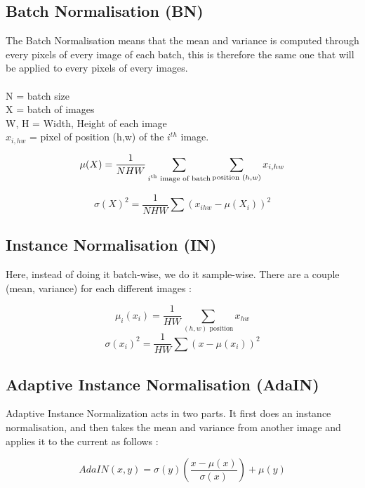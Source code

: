 \documentclass[a4paper]{article}
\begin{document}
\subsection{Batch Normalisation (BN)}
The Batch Normalisation means that the mean and variance is computed through every pixels of every image of each batch, this is therefore the same one that will be applied to every pixels of every images.
\\\\N = batch size
\\X = batch of images
\\W, H = Width, Height of each image
\\ $x_{i,hw}$ = pixel of position (h,w) of the $i^{th}$ image.

\begin{equation}
    \mu(X) = \frac{1}{NHW}\sum_{i\text{\textsuperscript{th} image of batch}}\sum_{\text{position }(h, w)} x_{i, hw}
\end{equation}

\begin{equation}
    \sigma(X)^2 = \frac{1}{NHW}\sum (x_{ihw} - \mu(X_i))^2 
\end{equation}

\subsection{Instance Normalisation (IN)}

Here, instead of doing it batch-wise, we do it sample-wise. There are a couple (mean, variance) for each different images : 

\begin{equation}
    \mu_i(x_i) = \frac{1}{HW}\sum_{(h, w)\text{ position}} x_{hw}
\end{equation}
\begin{equation}
    \sigma(x_i)^2 = \frac{1}{HW}\sum (x - \mu(x_i))^2 
\end{equation}

\subsection{Adaptive Instance Normalisation (AdaIN)}
Adaptive Instance Normalization acts in two parts. It first does an instance normalisation, and then takes the mean and variance from another image and applies it to the current as follows : 

\begin{equation}
AdaIN(x, y) = \sigma(y) \left(\frac{x - \mu(x)}{\sigma(x)}\right) + \mu(y)
\end{equation}
\end{document}
